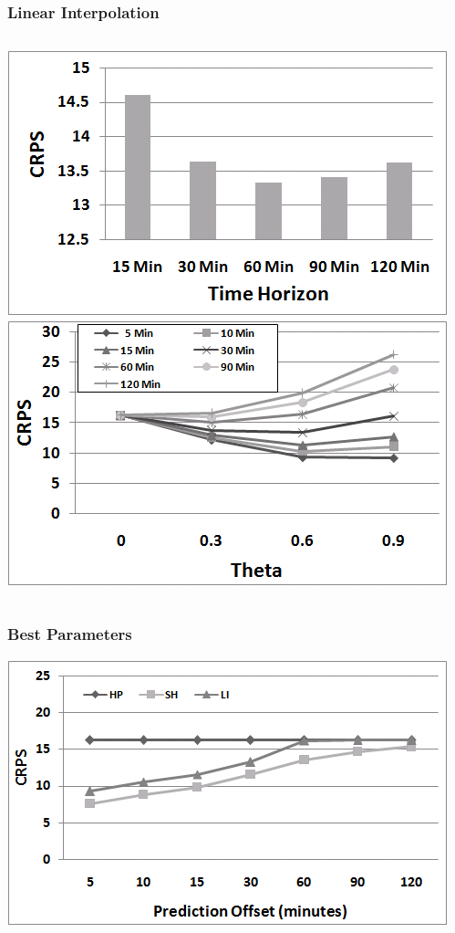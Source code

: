 \documentclass[t]{beamer}
\begin{document}
\begin{frame}\frametitle{Linear Interpolation}
\vspace{0.5in}
\begin{columns}
		\includegraphics[scale=0.3]{Links_Interpolated_TimeHorizon.png}
		\includegraphics[scale=0.3]{Links_Interpolated_Theta.png}
\end{columns}
\end{frame}

\begin{frame}\frametitle{Best Parameters}
\begin{center}
	\includegraphics[scale=0.5]{Links_Best.png}
\end{center}
\end{frame}
\end{document}
